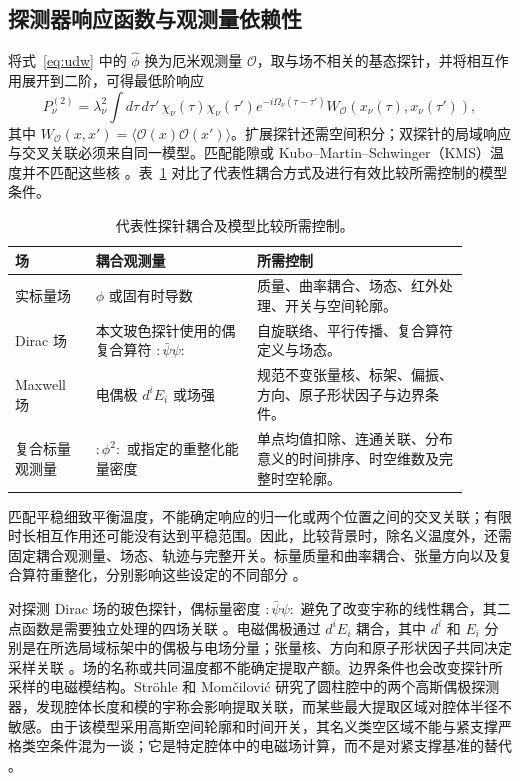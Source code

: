 \documentclass[UTF8,11pt,a4paper,fontset=none]{ctexart}
\begin{document}
\subsection{探测器响应函数与观测量依赖性}
将式~\eqref{eq:udw} 中的 $\hat\phi$ 换为厄米观测量 $\mathcal O$，取与场不相关的基态探针，并将相互作用展开到二阶，可得最低阶响应
\begin{equation}
P_\nu^{(2)}=\lambda_\nu^2\int d\tau\,d\tau'\,
\chi_\nu(\tau)\chi_\nu(\tau')e^{-i\Omega_\nu(\tau-\tau')}
W_{\mathcal O}(x_\nu(\tau),x_\nu(\tau')),
\label{eq:generic-field-operator-response}
\end{equation}
其中 $W_{\mathcal O}(x,x')=\langle\mathcal O(x)\mathcal O(x')\rangle$。扩展探针还需空间积分；双探针的局域响应与交叉关联必须来自同一模型。匹配能隙或 Kubo--Martin--Schwinger（KMS）温度并不匹配这些核 \cite{BirrellDavies1982,Wald1994}。表~\ref{tab:field-coupling-comparison} 对比了代表性耦合方式及进行有效比较所需控制的模型条件。

\begin{table}[htbp]
\centering\small
\caption{代表性探针耦合及模型比较所需控制。}
\label{tab:field-coupling-comparison}
\begin{tabular}{p{0.16\linewidth}p{0.32\linewidth}p{0.42\linewidth}}
\toprule
场 & 耦合观测量 & 所需控制\\
\midrule
实标量场 & $\phi$ 或固有时导数 & 质量、曲率耦合、场态、红外处理、开关与空间轮廓。\\
Dirac 场 & 本文玻色探针使用的偶复合算符 $:\bar\psi\psi:$ & 自旋联络、平行传播、复合算符定义与场态。\\
Maxwell 场 & 电偶极 $d^iE_i$ 或场强 & 规范不变张量核、标架、偏振、方向、原子形状因子与边界条件。\\
复合标量观测量 & $:\phi^2:$ 或指定的重整化能量密度 & 单点均值扣除、连通关联、分布意义的时间排序、时空维数及完整时空轮廓。\\
\bottomrule
\end{tabular}
\end{table}

匹配平稳细致平衡温度，不能确定响应的归一化或两个位置之间的交叉关联；有限时长相互作用还可能没有达到平稳范围。因此，比较背景时，除名义温度外，还需固定耦合观测量、场态、轨迹与完整开关。标量质量和曲率耦合、张量方向以及复合算符重整化，分别影响这些设定的不同部分 \cite{BukhariWang2024,CrispinoHiguchiMatsas2008}。

对探测 Dirac 场的玻色探针，偶标量密度 $:\bar\psi\psi:$ 避免了改变宇称的线性耦合，其二点函数是需要独立处理的四场关联 \cite{LoukoToussaint2016,DubeyKolekar2025}。电磁偶极通过 $d^iE_i$ 耦合，其中 $d^i$ 和 $E_i$ 分别是在所选局域标架中的偶极与电场分量；张量核、方向和原子形状因子共同决定采样关联 \cite{PozasKerstjensEM2016}。场的名称或共同温度都不能确定提取产额。边界条件也会改变探针所采样的电磁模结构。Ströhle 和 Momčilović 研究了圆柱腔中的两个高斯偶极探测器，发现腔体长度和模的宇称会影响提取关联，而某些最大提取区域对腔体半径不敏感。由于该模型采用高斯空间轮廓和时间开关，其名义类空区域不能与紧支撑严格类空条件混为一谈；它是特定腔体中的电磁场计算，而不是对紧支撑基准的替代 \cite{StrohleMomcilovic2026}。
\end{document}
